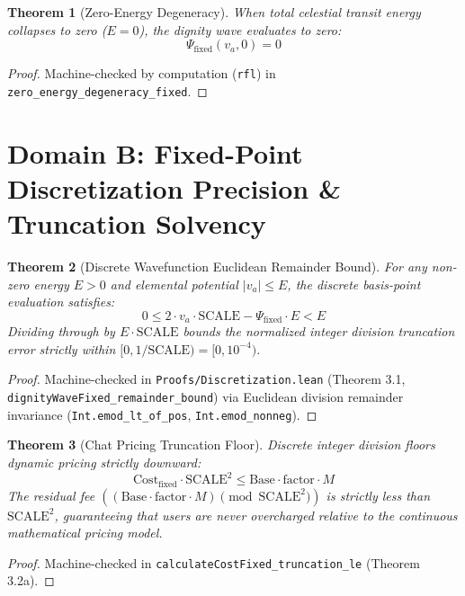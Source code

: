 \documentclass[11pt,a4paper]{article}
\theoremstyle{plain}
\newtheorem{theorem}{Theorem}[section]
\theoremstyle{definition}
\theoremstyle{remark}
\begin{document}
\begin{theorem}[Zero-Energy Degeneracy]
\label{thm:zero_energy}
When total celestial transit energy collapses to zero ($E = 0$), the dignity wave evaluates to zero:
\begin{equation}
    \Psi_{\text{fixed}}(v_a, 0) = 0
\end{equation}
\end{theorem}
\begin{proof}
Machine-checked by computation (\texttt{rfl}) in \texttt{zero\_energy\_degeneracy\_fixed}.
\end{proof}

\section{Domain B: Fixed-Point Discretization Precision \& Truncation Solvency}

\begin{theorem}[Discrete Wavefunction Euclidean Remainder Bound]
\label{thm:discretization_eps}
For any non-zero energy $E > 0$ and elemental potential $|v_a| \le E$, the discrete basis-point evaluation satisfies:
\begin{equation}
    0 \le 2 \cdot v_a \cdot \text{SCALE} - \Psi_{\text{fixed}} \cdot E < E
\end{equation}
Dividing through by $E \cdot \text{SCALE}$ bounds the normalized integer division truncation error strictly within $[0, 1 / \text{SCALE}) = [0, 10^{-4})$.
\end{theorem}
\begin{proof}
Machine-checked in \texttt{Proofs/Discretization.lean} (Theorem 3.1, \texttt{dignityWaveFixed\_remainder\_bound}) via Euclidean division remainder invariance (\texttt{Int.emod\_lt\_of\_pos}, \texttt{Int.emod\_nonneg}).
\end{proof}

\begin{theorem}[Chat Pricing Truncation Floor]
\label{thm:pricing_floor}
Discrete integer division floors dynamic pricing strictly downward:
\begin{equation}
    \text{Cost}_{\text{fixed}} \cdot \text{SCALE}^2 \le \text{Base} \cdot \text{factor} \cdot M
\end{equation}
The residual fee $((\text{Base} \cdot \text{factor} \cdot M) \pmod{\text{SCALE}^2})$ is strictly less than $\text{SCALE}^2$, guaranteeing that users are never overcharged relative to the continuous mathematical pricing model.
\end{theorem}
\begin{proof}
Machine-checked in \texttt{calculateCostFixed\_truncation\_le} (Theorem 3.2a).
\end{proof}
\end{document}
